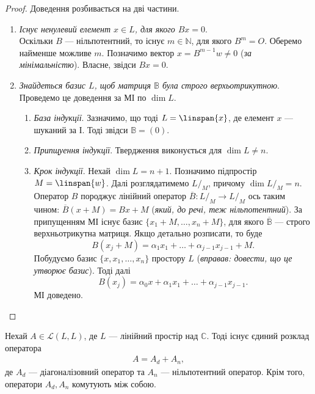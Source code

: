 \documentclass{math_library}
\begin{document}
\begin{proof}
Доведення розбивається на дві частини.
\begin{enumerate}[wide=0pt,label={\Roman*.}]
\item \textit{Існує ненулевий елемент $x \in L$, для якого $Bx = 0$}.\\
Оскільки $B$ --- нільпотентний, то існує $m \in \mathbb{N}$, для якого $B^m = O$. Оберемо найменше можливе $m$. Позначимо вектор $x = B^{m-1}w \neq 0$ (\textit{за мінімальністю}). Власне, звідси $Bx = 0$.

\item \textit{Знайдеться базис $L$, щоб матриця $\mathbb{B}$ була строго верхьотрикутною}.\\
Проведемо це доведення за МІ по $\dim L$.
\begin{enumerate}[nosep,wide=0pt,label={\roman*.}]
\item \textit{База індукції}. Зазначимо, що тоді $L = \linspan\{x\}$, де елемент $x$ --- шуканий за І. Тоді звідси $\mathbb{B} = (0)$.
\item \textit{Припщуення індукції}. Твердження виконується для $\dim L \neq n$.
\item \textit{Крок індукції}. Нехай $\dim L = n+1$. Позначимо підпростір $M = \linspan\{w\}$. Далі розглядатимемо $L/_M$, причому $\dim L/_M = n$. Оператор $B$ породжує лінійний оператор $\overline{B} \colon L/_M \to L/_M$ ось таким чином: $\overline{B}(x+M) = Bx + M$ (\textit{який, до речі, теж нільпотентний}). За припущенням МІ існує базис $\{x_1 + M, \dots , x_n + M\}$, для якого $\overline{\mathbb{B}}$ --- строго верхньотрикутна матриця. Якщо детально розписати, то буде 
\[
B(x_j + M) = \alpha_1 x_1 + \dots + \alpha_{j-1} x_{j-1} + M.
\]
Побудуємо базис $\{x,x_1,\dots,x_n\}$ простору $L$ (\textit{вправав: довести, що це утворює базис}). Тоді далі 
\[
B(x_j) = \alpha_0 x + \alpha_1 x_1 + \dots + \alpha_{j-1} x_{j-1}.
\]
МІ доведено. \qedhere
\end{enumerate}
\end{enumerate}
\end{proof}

\begin{theorem}
Нехай $A \in \mathcal{L}(L,L)$, де $L$ --- лінійний простір над $\mathbb{C}$. Тоді існує єдиний розклад оператора
\begin{align*}
A = A_d + A_n,
\end{align*}
де $A_d$ --- діагоналізовний оператор та $A_n$ --- нільпотентний оператор. Крім того, оператори $A_d,A_n$ комутують між собою.
\end{theorem}
\end{document}

